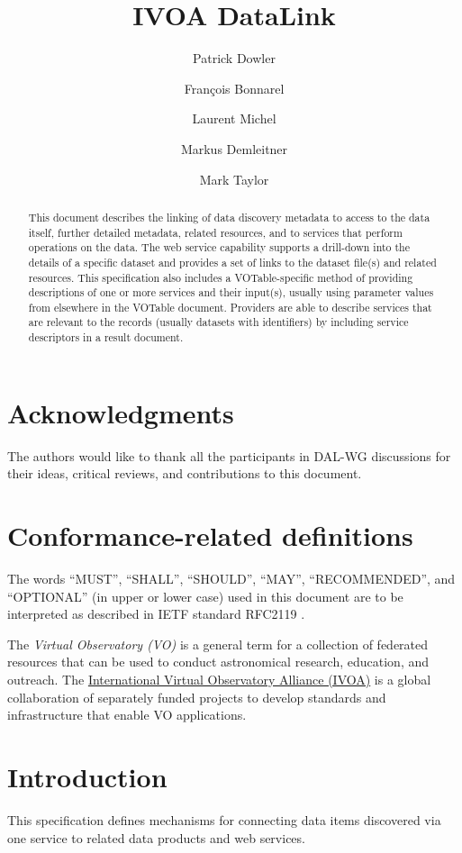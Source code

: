 \documentclass[11pt,a4paper]{ivoa}
\title{IVOA DataLink}
\author[http://www.ivoa.net/twiki/bin/view/IVOA/PatrickDowler]
       {Patrick Dowler}
\author[http://www.ivoa.net/twiki/bin/view/IVOA/FrancoisBonnarel]
       {Fran\c{c}ois Bonnarel}
\author[http://www.ivoa.net/twiki/bin/view/IVOA/LaurentMichel]
       {Laurent Michel}
\author[http://www.ivoa.net/twiki/bin/view/IVOA/MarkusDemleitner]
       {Markus Demleitner}
\author[http://www.ivoa.net/twiki/bin/view/IVOA/MarkTaylor]
       {Mark Taylor}
\begin{document}
\begin{abstract}
This document describes the linking of data discovery metadata
to access to the data itself, further detailed metadata, related
resources, and to services that perform operations on the data. The web
service capability supports a drill-down into the details of a specific
dataset and provides a set of links to the dataset file(s) and related
resources. This specification also includes a VOTable-specific method
of providing descriptions of one or more services and their input(s),
usually using parameter values from elsewhere in the VOTable document.
Providers are able to describe services that are relevant to the records
(usually datasets with identifiers) by including service descriptors in
a result document.
\end{abstract}


\section*{Acknowledgments}

The authors would like to thank all the participants in DAL-WG discussions
for their ideas, critical reviews, and contributions to this document.


\section*{Conformance-related definitions}

The words ``MUST'', ``SHALL'', ``SHOULD'', ``MAY'', ``RECOMMENDED'', and
``OPTIONAL'' (in upper or lower case) used in this document are to be
interpreted as described in IETF standard RFC2119 \citep{std:RFC2119}.

The \emph{Virtual Observatory (VO)} is a
general term for a collection of federated resources that can be used
to conduct astronomical research, education, and outreach.
The \href{http://www.ivoa.net}{International
Virtual Observatory Alliance (IVOA)} is a global
collaboration of separately funded projects to develop standards and
infrastructure that enable VO applications.


\section{Introduction}

This specification defines mechanisms for connecting data items
discovered via one service to related data products and web services.
\end{document}
